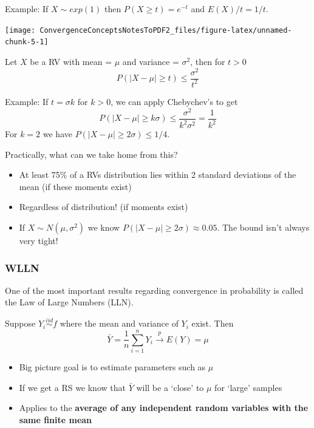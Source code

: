 \documentclass[
]{article}
\providecommand{\tightlist}{%
  \setlength{\itemsep}{0pt}\setlength{\parskip}{0pt}}
\begin{document}
Example: If \(X\sim exp(1)\) then \(P(X\geq t)=e^{-t}\) and
\(E(X)/t=1/t\).

\begin{center}\texttt{[image: ConvergenceConceptsNotesToPDF2\_files/figure-latex/unnamed-chunk-5-1]} \end{center}

\begin{description}
\tightlist
\item[Chebychev's Inequality]
Let \(X\) be a RV with mean = \(\mu\) and variance = \(\sigma^2\), then
for \(t>0\) \[P(|X-\mu|\geq t)\leq \frac{\sigma^2}{t^2}\]
\end{description}

Example: If \(t=\sigma k\) for \(k>0\), we can apply Chebychev's to get
\[P\left(|X-\mu|\geq k\sigma\right)\leq \frac{\sigma^2}{k^2\sigma^2}=\frac{1}{k^2}\]
For \(k=2\) we have \(P\left(|X-\mu|\geq 2\sigma\right)\leq 1/4\).

Practically, what can we take home from this?

\begin{itemize}
\tightlist
\item
  At least 75\% of a RVs distribution lies within 2 standard deviations
  of the mean (if these moments exist)
\item
  Regardless of distribution! (if moments exist)
\item
  If \(X\sim N(\mu,\sigma^2)\) we know
  \(P(|X-\mu|\geq 2\sigma)\approx 0.05\). The bound isn't always very
  tight!
\end{itemize}

\hypertarget{wlln}{%
\subsubsection{WLLN}\label{wlln}}

One of the most important results regarding convergence in probability
is called the Law of Large Numbers (LLN).

\begin{description}
\tightlist
\item[(Weak) Law of Large Numbers (WLLN)]
Suppose \(Y_i\stackrel{iid}\sim f\) where the mean and variance of
\(Y_i\) exist. Then
\[\bar{Y}=\frac{1}{n}\sum_{i=1}^{n}Y_i\stackrel{p}\rightarrow E(Y)=\mu\]
\end{description}

\begin{itemize}
\tightlist
\item
  Big picture goal is to estimate parameters such as \(\mu\)
\item
  If we get a RS we know that \(\bar{Y}\) will be a `close' to \(\mu\)
  for `large' samples
\item
  Applies to the \textbf{average of any independent random variables
  with the same finite mean}
\end{itemize}
\end{document}
